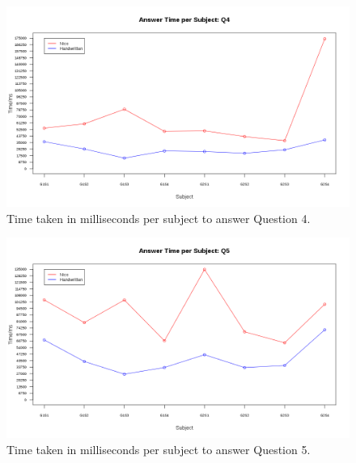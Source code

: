 \documentclass[12pt,twoside,notitlepage,xetex]{report}
\begin{document}
\begin{center}
\begin{figure}[H]
\begin{center}
\includegraphics[width=\textwidth-2cm]{figs/graphs/q4.png}
\end{center}
\caption{Time taken in milliseconds per subject to answer Question 4.}
\end{figure}
\end{center}

\begin{center}
\begin{figure}[H]
\begin{center}
\includegraphics[width=\textwidth-2cm]{figs/graphs/q5.png}
\end{center}
\caption{Time taken in milliseconds per subject to answer Question 5.}
\end{figure}
\end{center}
\end{document}
